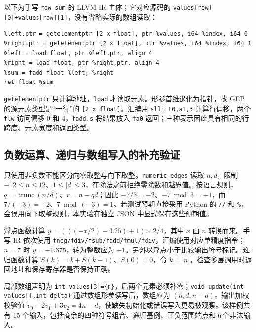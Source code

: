 \documentclass[UTF8,a4paper,10pt,fontset=fandol]{ctexart}
\begin{document}
以下为手写 \texttt{row\_sum} 的 LLVM IR 主体；它对应源码的 \texttt{values[row][0]+values[row][1]}，没有省略实际的数组读取：
\par\noindent\begin{minipage}{\linewidth}
\begin{lstlisting}[numbers=none]
%index = sext i32 %row to i64
%left.ptr = getelementptr [2 x float], ptr %values, i64 %index, i64 0
%right.ptr = getelementptr [2 x float], ptr %values, i64 %index, i64 1
%left = load float, ptr %left.ptr, align 4
%right = load float, ptr %right.ptr, align 4
%sum = fadd float %left, %right
ret float %sum
\end{lstlisting}
\end{minipage}\par
\texttt{getelementptr} 只计算地址，\texttt{load} 才读取元素。形参首维退化为指针，故 GEP 的源元素类型是“一行”的 \texttt{[2 x float]}。汇编用 \texttt{slli t0,a1,3} 计算行偏移，两个 \texttt{flw} 访问偏移 0 和 4，\texttt{fadd.s} 将结果放入 \texttt{fa0} 返回；三种表示因此具有相同的行跨度、元素宽度和返回类型。

\subsection{负数运算、递归与数组写入的补充验证}
只使用非负数不能区分向零取整与向下取整。\texttt{numeric\_edges} 读取 $n,d$，限制 $-12\le n\le12$、$1\le|d|\le3$，在除法之前拒绝零除数和越界值。按语言规则，$q=\operatorname{trunc}(n/d)$、$r=n-qd$；因此 $-7/3=-2$、$-7\bmod3=-1$，而 $7/(-3)=-2$、$7\bmod(-3)=1$。若测试预期直接采用 Python 的 \texttt{//} 和 \texttt{\%}，会误用向下取整规则。本实验在独立 JSON 中显式保存这些预期值。

浮点函数计算 $y=(((-x/2)-0.25)+1)\times2/4$，其中 $x$ 由 $n$ 转换而来。手写 IR 依次使用 \texttt{fneg/fdiv/fsub/fadd/fmul/fdiv}，汇编使用对应单精度指令；$n=7$ 时 $y=-1.375$，转为整数应为 $-1$。另外以浮点小于比较输出符号标记。递归函数计算 $S(k)=k+S(k-1)$、$S(0)=0$，令 $k=|n|$，检查多层调用时返回地址和保存寄存器是否保持正确。

局部数组声明为 \texttt{int values[3]=\{n\}}，后两个元素必须补零；\texttt{void update(int values[],int delta)} 通过数组形参读写后，数组应为 $(n,d,n-d)$。输出加权校验值 $v_0+2v_1+3v_2=4n-d$，使缺失初始化或错误写入更易被观察。该样例共有 15 个输入，包括商余的四种符号组合、递归基例、正负范围端点和五个非法输入。
\end{document}
